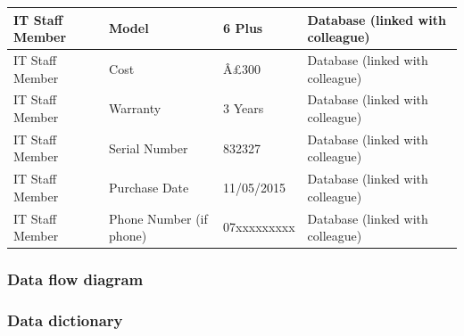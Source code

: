 \begin{table}[H]
{\begin{tabular}{|p{4cm}|p{5.3cm}|p{8cm}|p{3cm}|}
IT Staff Member                             & Model                              & 6 Plus                                             & Database (linked with colleague)                                      \\ \hline
IT Staff Member                       & Cost                              & Â£300                                               & Database (linked with colleague)          \\ \hline
IT Staff Member                       & Warranty                           & 3 Years                                            & Database (linked with colleague)          \\ \hline
IT Staff Member                       & Serial Number                      & 832327                                             & Database (linked with colleague)          \\ \hline
IT Staff Member                       & Purchase Date                      & 11/05/2015                                         & Database (linked with colleague)          \\ \hline
IT Staff Member                       & Phone Number (if phone)            & 07xxxxxxxxx                                        & Database (linked with colleague)          \\ \hline
\end{tabular}
}
\end{table}

\subsubsection{Data flow diagram}

\subsubsection{Data dictionary}

